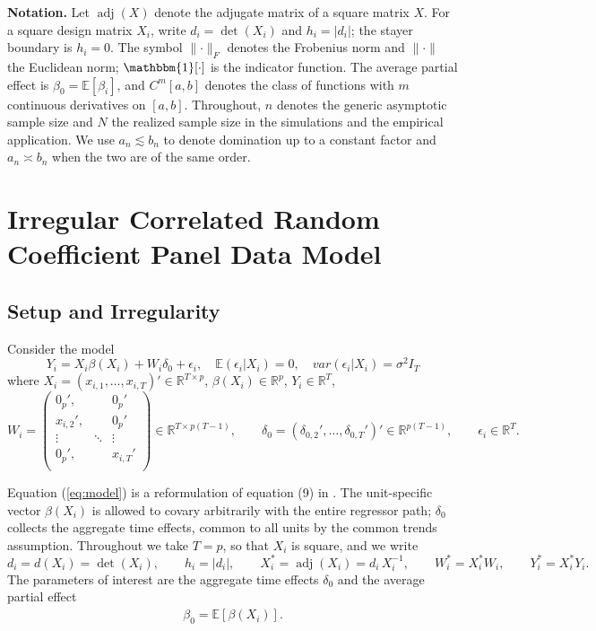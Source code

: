 \documentclass{article}
\newcommand{\normm}[1]{\lVert#1\rVert}
\newcommand{\E}{\mathbb{E}}
\newcommand{\R}{\mathbb{R}}
\newcommand{\I}{\mathbbm{1}}
\DeclareMathOperator{\adj}{adj}
\begin{document}
\textbf{Notation.} Let $\adj(X)$ denote the adjugate matrix of a square matrix $X$. For a square design matrix $X_i$, write $d_i=\det(X_i)$ and $h_i=|d_i|$; the stayer boundary is $h_i=0$. The symbol $\normm{\cdot}_F$ denotes the Frobenius norm and $\normm{\cdot}$ the Euclidean norm; $\I[\cdot]$ is the indicator function. The average partial effect is $\beta_0=\mathbb{E}[\beta_i]$, and $C^{m}[a,b]$ denotes the class of functions with $m$ continuous derivatives on $[a,b]$. Throughout, $n$ denotes the generic asymptotic sample size and $N$ the realized sample size in the simulations and the empirical application. We use $a_n\lesssim b_n$ to denote domination up to a constant factor and $a_n\asymp b_n$ when the two are of the same order.

\newpage

\section{Irregular Correlated Random Coefficient Panel Data Model}\label{sec:model}
\subsection{Setup and Irregularity}

Consider the model
\begin{equation}\label{eq:model}
    Y_i = X_i\beta(X_i)+W_i\delta_0 + \epsilon_i, \quad \E(\epsilon_i|X_i)=0,\quad var(\epsilon_i|X_i)=\sigma^2I_T
\end{equation}
where $X_i=(x_{i,1},\dots,x_{i,T})'\in\R^{T\times p}$, $\beta(X_i)\in\R^p$, $Y_i\in\R^T$,
\[
W_i = \begin{pmatrix}
    0_{p}',& & 0_p'\\
    x_{i,2}',& & 0_p'\\
    \vdots&  \ddots & \vdots\\
    0_{p}',& & x_{i,T}'\\
\end{pmatrix}\in\R^{T\times p(T-1)},
\qquad
\delta_0=(\delta_{0,2}',\dots,\delta_{0,T}')'\in\R^{p(T-1)},
\qquad \epsilon_i\in\R^T .
\]
 
Equation (\ref{eq:model}) is a reformulation of equation (9) in \cite{grahampowell}. The unit-specific vector $\beta(X_i)$ is allowed to covary arbitrarily with the entire regressor path; $\delta_0$ collects the aggregate time effects, common to all units by the common trends assumption. Throughout we take $T=p$, so that $X_i$ is square, and we write
\[
    d_i=d(X_i)=\det(X_i),\qquad h_i=|d_i|,\qquad X_i^{*}=\adj(X_i)=d_i\,X_i^{-1},
    \qquad W_i^{*}=X_i^{*}W_i,\qquad Y_i^{*}=X_i^{*}Y_i .
\]
The parameters of interest are the aggregate time effects $\delta_0$ and the average partial effect
\begin{align}\label{eq:estimand}
    \beta_0 = \E[\beta(X_i)].
\end{align}
\end{document}
